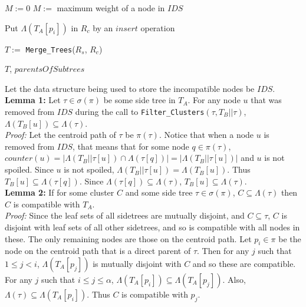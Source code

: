 \documentclass{article}
\begin{document}
\begin{algorithm}
\begin{algorithmic}[1]
                    \State $M := 0$
                \Else
                    \State $M :=$ maximum weight of a node in $IDS$
                \EndIf

                    \State Put $\Lambda(T_A[p_i])$ in $R_c$ by an $insert$ operation
                \EndIf
            \EndFor

            \State $T := $ \texttt{Merge\_Trees}($R_s$, $R_c$)

            \State \Return $T$, $parentsOfSubtrees$
        \end{algorithmic}
    \end{algorithm}

    Let the data structure being used to store the incompatible nodes be $IDS$.\\

    \textbf{Lemma 1:} Let $\tau \in \sigma(\pi)$ be some side tree in $T_A$. For any node $u$ that was removed from $IDS$ during the call to \texttt{Filter\_Clusters}$(\tau, T_B||\tau)$, $\Lambda(T_B[u]) \subseteq \Lambda(\tau)$.\\
    \textit{Proof:} Let the centroid path of $\tau$ be $\pi(\tau)$. Notice that when a node $u$ is removed from $IDS$, that means that for some node $q \in \pi(\tau)$, $counter(u) = |\Lambda(T_B||\tau[u]) \cap \Lambda(\tau[q])| = |\Lambda(T_B||\tau[u])|$ and $u$ is not spoiled. Since $u$ is not spoiled, $\Lambda(T_B||\tau[u]) = \Lambda(T_B[u])$. Thus $T_B[u] \subseteq \Lambda(\tau[q])$. Since $\Lambda(\tau[q]) \subseteq \Lambda(\tau)$, $T_B[u] \subseteq \Lambda(\tau)$.\\

    \textbf{Lemma 2:} If for some cluster $C$ and some side tree $\tau \in \sigma(\pi)$, $C \subseteq \Lambda(\tau)$ then $C$ is compatible with $T_A$.\\
    \textit{Proof:} Since the leaf sets of all sidetrees are mutually disjoint, and $C \subseteq \tau$, $C$ is disjoint with leaf sets of all other sidetrees, and so is compatible with all nodes in these. The only remaining nodes are those on the centroid path. Let $p_i \in \pi$ be the node on the centroid path that is a direct parent of $\tau$. Then for any $j$ such that $1 \leq j < i$, $\Lambda(T_A[p_j])$ is mutually disjoint with $C$ and so these are compatible. For any $j$ such that $i \leq j \leq \alpha$, $\Lambda(T_A[p_i]) \subseteq \Lambda(T_A[p_j])$. Also, $\Lambda(\tau) \subseteq \Lambda(T_A[p_i])$. Thus $C$ is compatible with $p_j$.\\
\end{document}
